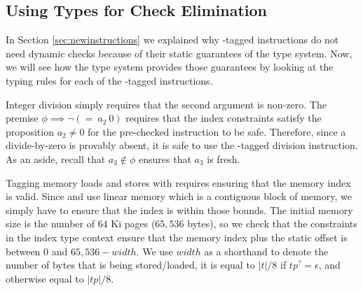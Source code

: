 \subsection{Using Types for Check Elimination}
\label{subsec:checkelim}
In Section \ref{sec:newinstructions} we explained why \prechk-tagged instructions do not need dynamic checks because of their static guarantees of the \name type system.
Now, we will see how the \name type system provides those guarantees by looking at the typing rules for each of the \prechk-tagged instructions.

Integer division simply requires that the second argument is non-zero.
The premise $\phi \implies \neg(=\ a_2\ 0)$ requires that the index constraints satisfy the proposition $a_2 \neq 0$ for the pre-checked instruction to be safe.
Therefore, since a divide-by-zero is provably absent, it is safe to use the \prechk-tagged division instruction.
As an aside, recall that $a_3 \not\in \phi$ ensures that $a_3$ is fresh.
\begin{mathpar}
\end{mathpar}

Tagging memory loads and stores with \prechk requires ensuring that the memory index is valid.
Since \wasm and \name use linear memory which is a contiguous block of memory, we simply have to ensure that the index is within those bounds.
The initial memory size is the number of $64$ Ki pages ($65,536$ bytes), so we check that the constraints in the index type context ensure that the memory index plus the static offset is between $0$ and $65,536-width$.
We use $width$ as a shorthand to denote the number of bytes that is being stored/loaded, it is equal to $|t|/8$ if $tp^{?}=\epsilon$, and otherwise equal to $|tp|/8$.

